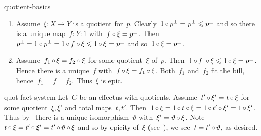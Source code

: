 \begin{solution}{quotient-basics}
\begin{enumerate}
    then~$h=0$ and so any map into zero is indeed a quotient for~$1$.
\item
Assume~$\xi \colon X \to Y$ is a quotient for~$p$.
Clearly~$1 \mathop{\circ} p^\perp = p^\perp \leqslant p^\perp$
    and so there is a unique map~$f\colon Y \colon 1$
        with~$f \mathop{\circ} \xi = p^\perp$.
Then~$p^\perp = 1\mathop{\circ} p^\perp=  1 \mathop{\circ} f \mathop{\circ} \xi \leqslant 1 \mathop{\circ} \xi = p^\perp$
    and so~$1 \mathop{\circ} \xi = p^\perp$.
\item
Assume~$f_1 \mathop{\circ} \xi = f_2 \mathop{\circ} \xi$
    for some quotient~$\xi$ of~$p$.
        Then~$1 \mathop{\circ} f_1 \mathop{\circ} \xi \leqslant 1 \mathop{\circ} \xi = p^\perp$.
    Hence there is a unique~$f$ with~$f \mathop{\circ} \xi = f_1 \mathop{\circ} \xi$.
    Both~$f_1$ and~$f_2$ fit the bill, hence~$f_1=f=f_2$.
    Thus~$\xi$ is epic.
\end{enumerate}
\end{solution}
\spacingfix{}
\begin{solution}{quot-fact-system}%
Let~$C$ be an effectus with quotients.
Assume~$t' \mathop{\circ} \xi' = t \mathop{\circ} \xi$
    for some quotient~$\xi,\xi'$ and total maps~$t,t'$.
Then~$1 \mathop{\circ} \xi = 1 \mathop{\circ} t \mathop{\circ} \xi = 1 \mathop{\circ} t' \mathop{\circ} \xi'
        = 1 \mathop{\circ} \xi'$.
    Thus by~ there is a unique isomorphism~$\vartheta$
        with~$\xi' = \vartheta \mathop{\circ} \xi$.
Note~$t \mathop{\circ} \xi = t' \mathop{\circ} \xi' = t' \mathop{\circ} \vartheta \mathop{\circ} \xi$
    and so by epicity of~$\xi$
    (see~),
    we see~$t = t' \mathop{\circ} \vartheta$, as desired.
\end{solution}
